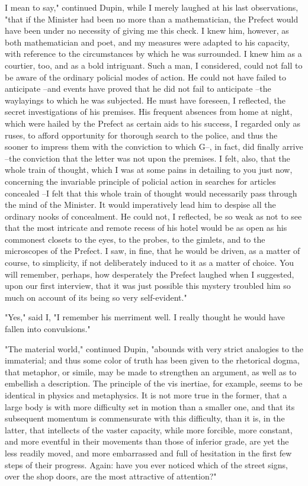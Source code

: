 \documentclass{article}
\begin{document}
I mean to say," continued Dupin, while I merely laughed at his last observations, "that if the Minister had been no more than a mathematician, the Prefect would have been under no necessity of giving me this check. I knew him, however, as both mathematician and poet, and my measures were adapted to his capacity, with reference to the circumstances by which he was surrounded. I knew him as a courtier, too, and as a bold intriguant. Such a man, I considered, could not fall to be aware of the ordinary policial modes of action. He could not have failed to anticipate --and events have proved that he did not fail to anticipate --the waylayings to which he was subjected. He must have foreseen, I reflected, the secret investigations of his premises. His frequent absences from home at night, which were hailed by the Prefect as certain aids to his success, I regarded only as ruses, to afford opportunity for thorough search to the police, and thus the sooner to impress them with the conviction to which G--, in fact, did finally arrive --the conviction that the letter was not upon the premises. I felt, also, that the whole train of thought, which I was at some pains in detailing to you just now, concerning the invariable principle of policial action in searches for articles concealed --I felt that this whole train of thought would necessarily pass through the mind of the Minister. It would imperatively lead him to despise all the ordinary nooks of concealment. He could not, I reflected, be so weak as not to see that the most intricate and remote recess of his hotel would be as open as his commonest closets to the eyes, to the probes, to the gimlets, and to the microscopes of the Prefect. I saw, in fine, that he would be driven, as a matter of course, to simplicity, if not deliberately induced to it as a matter of choice. You will remember, perhaps, how desperately the Prefect laughed when I suggested, upon our first interview, that it was just possible this mystery troubled him so much on account of its being so very self-evident."

"Yes," said I, "I remember his merriment well. I really thought he would have fallen into convulsions."

"The material world," continued Dupin, "abounds with very strict analogies to the immaterial; and thus some color of truth has been given to the rhetorical dogma, that metaphor, or simile, may be made to strengthen an argument, as well as to embellish a description. The principle of the vis inertiae, for example, seems to be identical in physics and metaphysics. It is not more true in the former, that a large body is with more difficulty set in motion than a smaller one, and that its subsequent momentum is commensurate with this difficulty, than it is, in the latter, that intellects of the vaster capacity, while more forcible, more constant, and more eventful in their movements than those of inferior grade, are yet the less readily moved, and more embarrassed and full of hesitation in the first few steps of their progress. Again: have you ever noticed which of the street signs, over the shop doors, are the most attractive of attention?"
\end{document}
